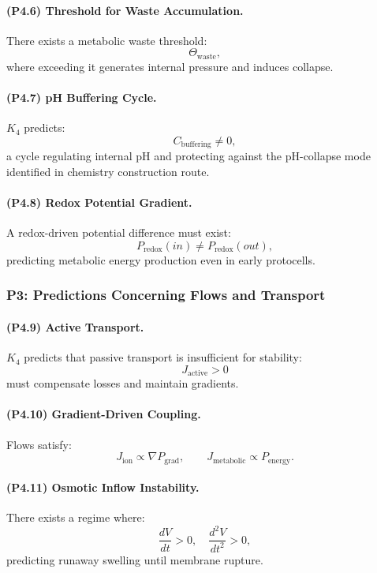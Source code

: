 \paragraph{(P4.6) Threshold for Waste Accumulation.}
There exists a metabolic waste threshold:
\[
\Theta_{\mathrm{waste}},
\]
where exceeding it generates internal pressure and induces collapse.

\paragraph{(P4.7) pH Buffering Cycle.}
$K_4$ predicts:
\[
C_{\mathrm{buffering}} \neq 0,
\]
a cycle regulating internal pH and protecting against the pH-collapse mode
identified in chemistry construction route.

\paragraph{(P4.8) Redox Potential Gradient.}
A redox-driven potential difference must exist:
\[
P_{\mathrm{redox}}(in) \neq P_{\mathrm{redox}}(out),
\]
predicting metabolic energy production even in early protocells.

\subsubsection{P3: Predictions Concerning Flows and Transport}

\paragraph{(P4.9) Active Transport.}
$K_4$ predicts that passive transport is insufficient for stability:
\[
J_{\mathrm{active}} > 0
\]
must compensate losses and maintain gradients.

\paragraph{(P4.10) Gradient-Driven Coupling.}
Flows satisfy:
\[
J_{\mathrm{ion}} \propto \nabla P_{\mathrm{grad}},
\qquad
J_{\mathrm{metabolic}} \propto P_{\mathrm{energy}}.
\]

\paragraph{(P4.11) Osmotic Inflow Instability.}
There exists a regime where:
\[
\frac{dV}{dt} > 0, \quad \frac{d^2V}{dt^2} > 0,
\]
predicting runaway swelling until membrane rupture.

